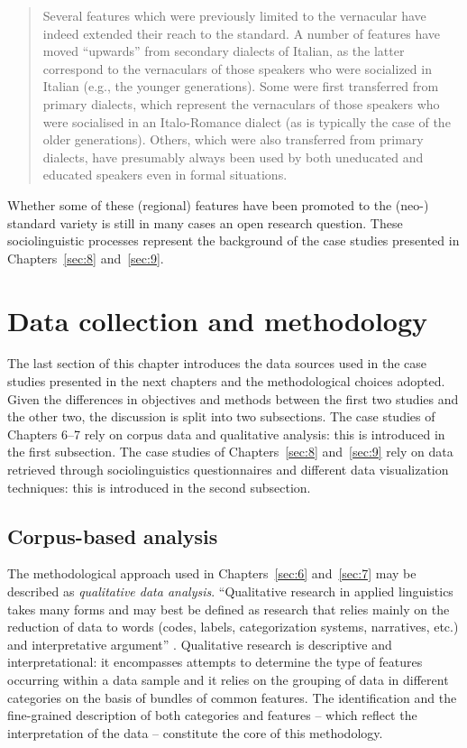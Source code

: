 \begin{quote}
Several features which were previously limited to the vernacular have indeed extended their reach to the standard. A number of features have moved “upwards” from secondary dialects of Italian, as the latter correspond to the vernaculars of those speakers who were socialized in Italian (e.g., the younger generations). Some were first transferred from primary dialects, which represent the vernaculars of those speakers who were socialised in an Italo-Romance dialect (as is typically the case of the older generations). Others, which were also transferred from primary dialects, have presumably always been used by both uneducated and educated speakers even in formal situations. \citep[131]{Cerruti2020}
\end{quote}

Whether some of these (regional) features have been promoted to the (neo-) standard variety is still in many cases an open research question. These sociolinguistic processes represent the background of the case studies presented in Chapters~\ref{sec:8} and~\ref{sec:9}.

\section{Data collection and methodology}
\hypertarget{Toc124860644}{}
The last section of this chapter introduces the data sources used in the case studies presented in the next chapters and the methodological choices adopted. Given the differences in objectives and methods between the first two studies and the other two, the discussion is split into two subsections. The case studies of Chapters 6–7 rely on corpus data and qualitative analysis: this is introduced in the first subsection. The case studies of Chapters~\ref{sec:8} and~\ref{sec:9} rely on data retrieved through sociolinguistics questionnaires and different data visualization techniques: this is introduced in the second subsection.

\subsection{Corpus-based analysis}
\hypertarget{Toc124860645}{}
The methodological approach used in Chapters~\ref{sec:6} and~\ref{sec:7} may be described as \textit{qualitative data analysis}. “Qualitative research in applied linguistics takes many forms and may best be defined as research that relies mainly on the reduction of data to words (codes, labels, categorization systems, narratives, etc.) and interpretative argument” \citep[1]{Benson2012}. Qualitative research is descriptive and interpretational: it encompasses attempts to determine the type of features occurring within a data sample and it relies on the grouping of data in different categories on the basis of bundles of common features. The identification and the fine-grained description of both categories and features – which reflect the interpretation of the data – constitute the core of this methodology.

